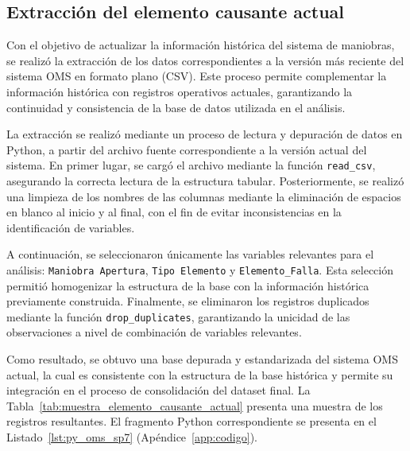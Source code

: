 \subsection{Extracción del elemento causante actual}
\label{sec:extraccion_oms_actual}
Con el objetivo de actualizar la información histórica del sistema de maniobras, se realizó la extracción de los datos correspondientes a la versión más reciente del sistema OMS en formato plano (CSV). Este proceso permite complementar la información histórica con registros operativos actuales, garantizando la continuidad y consistencia de la base de datos utilizada en el análisis.

La extracción se realizó mediante un proceso de lectura y depuración de datos en Python, a partir del archivo fuente correspondiente a la versión actual del sistema. En primer lugar, se cargó el archivo mediante la función \texttt{read\_csv}, asegurando la correcta lectura de la estructura tabular. Posteriormente, se realizó una limpieza de los nombres de las columnas mediante la eliminación de espacios en blanco al inicio y al final, con el fin de evitar inconsistencias en la identificación de variables.

A continuación, se seleccionaron únicamente las variables relevantes para el análisis: \texttt{Maniobra Apertura}, \texttt{Tipo Elemento} y \texttt{Elemento\_Falla}. Esta selección permitió homogenizar la estructura de la base con la información histórica previamente construida. Finalmente, se eliminaron los registros duplicados mediante la función \texttt{drop\_duplicates}, garantizando la unicidad de las observaciones a nivel de combinación de variables relevantes.

    Como resultado, se obtuvo una base depurada y estandarizada del sistema OMS actual, la cual es consistente con la estructura de la base histórica y permite su integración en el proceso de consolidación del dataset final. La Tabla~\ref{tab:muestra_elemento_causante_actual} presenta una muestra de los registros resultantes. El fragmento Python correspondiente se presenta en el Listado~\ref{lst:py_oms_sp7} (Apéndice~\ref{app:codigo}).

